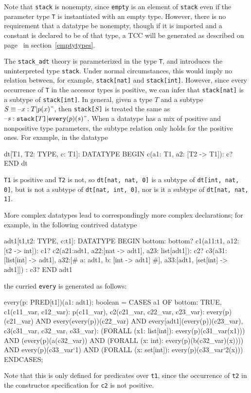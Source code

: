 Note that \texttt{stack} is nonempty, since \texttt{empty} is an element
of \texttt{stack} even if the parameter type \texttt{T} is instantiated
with an empty type.  However, there is no requirement that a datatype be
nonempty, though if it is imported and a constant is declared to be of
that type, a TCC will be generated as described on
page~\pageref{emptytypes} in section~\ref{emptytypes}.

The \texttt{stack\_adt} theory is parameterized in the type \texttt{T}, and
introduces the uninterpreted type \texttt{stack}.  Under normal
circumstances, this would imply no relation between, for example,
\texttt{stack[nat]} and \texttt{stack[int]}.  However, since every
occurrence of \texttt{T} in the accessor types is positive, we can infer
that \texttt{stack[nat]} is a subtype of \texttt{stack[int]}.  In general,
given a type $T$ and a subtype $S \equiv \setb{}x:T | p(x)\sete$, then
\texttt{stack[$S$]} is treated the same as
$\setb{}s: \texttt{stack[}T\texttt{]} | \texttt{every}(p)(s)\sete$.
When a datatype has a mix of positive and nonpositive type parameters, the
subtype relation only holds for the positive ones.  For example,
in the datatype
\begin{pvsex}
  dt[T1, T2: TYPE, c: T1]: DATATYPE
   BEGIN
    c(a1: T1, a2: [T2 -> T1]): c?
   END dt
\end{pvsex}
\texttt{T1} is positive and \texttt{T2} is not, so \texttt{dt[nat, nat,
0]} is a subtype of \texttt{dt[int, nat, 0]}, but is not a subtype of
\texttt{dt[nat, int, 0]}, nor is it a subtype of \texttt{dt[nat, nat, 1]}.

More complex datatypes lead to correspondingly more complex declarations;
for example, in the following contrived datatype
\begin{pvsex}
  adt1[t1,t2: TYPE, c:t1]: DATATYPE
   BEGIN
    bottom: bottom?
    c1(a11:t1, a12: [t2 -> int]): c1?
    c2(a21:adt1, a22:[nat -> adt1], a23: list[adt1]): c2?
    c3(a31:[list[int] -> adt1],
       a32:[# a: adt1, b: [int -> adt1] #],
       a33:[adt1, [set[int] -> adt1]]) : c3?
   END adt1
\end{pvsex}
the curried \texttt{every} is generated as follows:
\begin{pvsex}
  every(p: PRED[t1])(a1: adt1): boolean =
    CASES a1 OF
      bottom: TRUE,
      c1(c11_var, c12_var): p(c11_var),
      c2(c21_var, c22_var, c23_var):
          every(p)(c21_var)
              AND every(every(p))(c22_var)
                AND every[adt1](every(p))(c23_var),
      c3(c31_var, c32_var, c33_var):
          (FORALL (x1: list[int]): every(p)(c31_var(x1)))
              AND
            (every(p)(a(c32_var))
                 AND (FORALL (x: int): every(p)(b(c32_var)(x))))
                AND every(p)(c33_var`1)
                  AND
                (FORALL (x: set[int]):
                   every(p)(c33_var`2(x)))
      ENDCASES;
\end{pvsex}
Note that this is only defined for predicates over \texttt{t1}, since
the occurrence of \texttt{t2} in the constructor specification for
\texttt{c2} is not positive.

